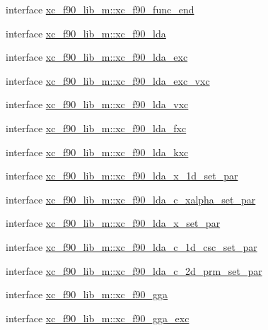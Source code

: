 \begin{DoxyCompactItemize}
\item 
interface \hyperlink{interfacexc__f90__lib__m_1_1xc__f90__func__end}{xc\-\_\-f90\-\_\-lib\-\_\-m\-::xc\-\_\-f90\-\_\-func\-\_\-end}
\item 
interface \hyperlink{interfacexc__f90__lib__m_1_1xc__f90__lda}{xc\-\_\-f90\-\_\-lib\-\_\-m\-::xc\-\_\-f90\-\_\-lda}
\item 
interface \hyperlink{interfacexc__f90__lib__m_1_1xc__f90__lda__exc}{xc\-\_\-f90\-\_\-lib\-\_\-m\-::xc\-\_\-f90\-\_\-lda\-\_\-exc}
\item 
interface \hyperlink{interfacexc__f90__lib__m_1_1xc__f90__lda__exc__vxc}{xc\-\_\-f90\-\_\-lib\-\_\-m\-::xc\-\_\-f90\-\_\-lda\-\_\-exc\-\_\-vxc}
\item 
interface \hyperlink{interfacexc__f90__lib__m_1_1xc__f90__lda__vxc}{xc\-\_\-f90\-\_\-lib\-\_\-m\-::xc\-\_\-f90\-\_\-lda\-\_\-vxc}
\item 
interface \hyperlink{interfacexc__f90__lib__m_1_1xc__f90__lda__fxc}{xc\-\_\-f90\-\_\-lib\-\_\-m\-::xc\-\_\-f90\-\_\-lda\-\_\-fxc}
\item 
interface \hyperlink{interfacexc__f90__lib__m_1_1xc__f90__lda__kxc}{xc\-\_\-f90\-\_\-lib\-\_\-m\-::xc\-\_\-f90\-\_\-lda\-\_\-kxc}
\item 
interface \hyperlink{interfacexc__f90__lib__m_1_1xc__f90__lda__x__1d__set__par}{xc\-\_\-f90\-\_\-lib\-\_\-m\-::xc\-\_\-f90\-\_\-lda\-\_\-x\-\_\-1d\-\_\-set\-\_\-par}
\item 
interface \hyperlink{interfacexc__f90__lib__m_1_1xc__f90__lda__c__xalpha__set__par}{xc\-\_\-f90\-\_\-lib\-\_\-m\-::xc\-\_\-f90\-\_\-lda\-\_\-c\-\_\-xalpha\-\_\-set\-\_\-par}
\item 
interface \hyperlink{interfacexc__f90__lib__m_1_1xc__f90__lda__x__set__par}{xc\-\_\-f90\-\_\-lib\-\_\-m\-::xc\-\_\-f90\-\_\-lda\-\_\-x\-\_\-set\-\_\-par}
\item 
interface \hyperlink{interfacexc__f90__lib__m_1_1xc__f90__lda__c__1d__csc__set__par}{xc\-\_\-f90\-\_\-lib\-\_\-m\-::xc\-\_\-f90\-\_\-lda\-\_\-c\-\_\-1d\-\_\-csc\-\_\-set\-\_\-par}
\item 
interface \hyperlink{interfacexc__f90__lib__m_1_1xc__f90__lda__c__2d__prm__set__par}{xc\-\_\-f90\-\_\-lib\-\_\-m\-::xc\-\_\-f90\-\_\-lda\-\_\-c\-\_\-2d\-\_\-prm\-\_\-set\-\_\-par}
\item 
interface \hyperlink{interfacexc__f90__lib__m_1_1xc__f90__gga}{xc\-\_\-f90\-\_\-lib\-\_\-m\-::xc\-\_\-f90\-\_\-gga}
\item 
interface \hyperlink{interfacexc__f90__lib__m_1_1xc__f90__gga__exc}{xc\-\_\-f90\-\_\-lib\-\_\-m\-::xc\-\_\-f90\-\_\-gga\-\_\-exc}

\end{DoxyCompactItemize}
